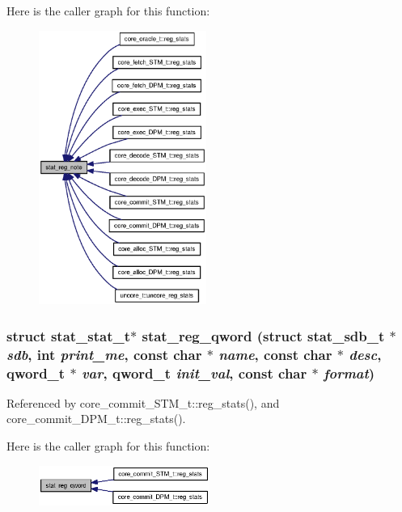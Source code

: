 Here is the caller graph for this function:\nopagebreak
\begin{figure}[H]
\begin{center}
\leavevmode
\includegraphics[width=155pt]{zesto_2stats_8h_ed9b9c4535e4fc2e59a090d6e8157d4f_icgraph}
\end{center}
\end{figure}
\subsubsection[{stat\_\-reg\_\-qword}]{\setlength{\rightskip}{0pt plus 5cm}struct {\bf stat\_\-stat\_\-t}$\ast$ stat\_\-reg\_\-qword (struct {\bf stat\_\-sdb\_\-t} $\ast$ {\em sdb}, \/  int {\em print\_\-me}, \/  const char $\ast$ {\em name}, \/  const char $\ast$ {\em desc}, \/  qword\_\-t $\ast$ {\em var}, \/  qword\_\-t {\em init\_\-val}, \/  const char $\ast$ {\em format})\hspace{0.3cm}{\tt  [read]}}\label{zesto_2stats_8h_d3b207566a223483451c345114249ac6}




Referenced by core\_\-commit\_\-STM\_\-t::reg\_\-stats(), and core\_\-commit\_\-DPM\_\-t::reg\_\-stats().

Here is the caller graph for this function:\nopagebreak
\begin{figure}[H]
\begin{center}
\leavevmode
\includegraphics[width=158pt]{zesto_2stats_8h_d3b207566a223483451c345114249ac6_icgraph}
\end{center}
\end{figure}
